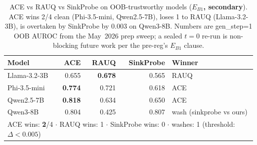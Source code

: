 \begin{table}[t]
\centering
\caption{ACE vs RAUQ vs SinkProbe on OOB-trustworthy models (\textbf{$E_{B1}$, secondary}). ACE wins 2/4 clean (Phi-3.5-mini, Qwen2.5-7B), loses 1 to RAUQ (Llama-3.2-3B), is overtaken by SinkProbe by 0.003 on Qwen3-8B. Numbers are gen\_step=1 OOB AUROC from the May~2026 prep sweep; a sealed $t{=}0$ re-run is non-blocking future work per the pre-reg's $E_{B1}$ clause.}
\label{tab:ace_baselines}
\small
\setlength{\tabcolsep}{6pt}
\begin{tabular}{@{}lrrrl@{}}
\toprule
\textbf{Model} & \textbf{ACE} & \textbf{RAUQ} & \textbf{SinkProbe} & \textbf{Winner} \\
\midrule
Llama-3.2-3B & 0.655 & \textbf{0.678} & 0.565 & RAUQ \\
Phi-3.5-mini & \textbf{0.774} & 0.721 & 0.618 & ACE \\
Qwen2.5-7B & \textbf{0.818} & 0.634 & 0.650 & ACE \\
Qwen3-8B & 0.804 & 0.425 & 0.807 & wash (sinkprobe vs ours) \\
\midrule
\multicolumn{5}{l}{ACE wins: \textbf{2}/4  $\cdot$  RAUQ wins: 1  $\cdot$  SinkProbe wins: 0  $\cdot$  washes: 1  (threshold: $\Delta < 0.005$)} \\
\bottomrule
\end{tabular}
\end{table}
